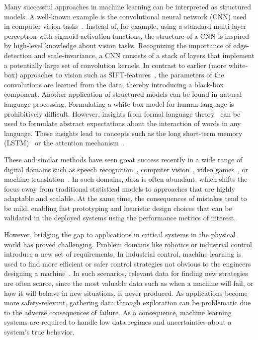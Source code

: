 Many successful approaches in machine learning can be interpreted as structured models.
A well-known example is the convolutional neural network (CNN) used in computer vision tasks~\parencite{lecun_backpropagation_1989}.
Instead of, for example, using a standard multi-layer perceptron with sigmoid activation functions, the structure of a CNN is inspired by high-level knowledge about vision tasks.
Recognizing the importance of edge-detection and scale-invariance, a CNN consists of a stack of layers that implement a potentially large set of convolution kernels.
In contrast to earlier (more white-box) approaches to vision such as SIFT-features~\parencite{lowe_object_1999}, the parameters of the convolutions are learned from the data, thereby introducing a black-box component.
Another application of structured models can be found in natural language processing.
Formulating a white-box model for human language is prohibitively difficult.
However, insights from formal language theory~\parencite{chomsky_aspects_2014} can be used to formulate abstract expectations about the interaction of words in any language.
These insights lead to concepts such as the long short-term memory (LSTM)~\parencite{hochreiter_long_1997} or the attention mechanism~\parencite{bahdanau_neural_2014,chorowski_attention-based_2015}.

These and similar methods have seen great success recently in a wide range of digital domains such as speech recognition~\parencite{chorowski_attention-based_2015}, computer vision~\parencite{russakovsky_imagenet_2015}, video games~\parencite{berner_dota_2019}, or machine translation~\parencite{johnson_googles_2017}.
In such domains, data is often abundant, which shifts the focus away from traditional statistical models to approaches that are highly adaptable and scalable.
At the same time, the consequences of mistakes tend to be mild, enabling fast prototyping and heuristic design choices that can be validated in the deployed systems using the performance metrics of interest.

However, bridging the gap to applications in critical systems in the physical world has proved challenging.
Problem domains like robotics or industrial control introduce a new set of requirements.
In industrial control, machine learning is used to find more efficient or safer control strategies not obvious to the engineers designing a machine~\parencite{hein_benchmark_2017}.
In such scenarios, relevant data for finding new strategies are often scarce, since the most valuable data such as when a machine will fail, or how it will behave in new situations, is never produced.
As applications become more safety-relevant, gathering data through exploration can be problematic due to the adverse consequences of failure.
As a consequence, machine learning systems are required to handle low data regimes and uncertainties about a system's true behavior.

